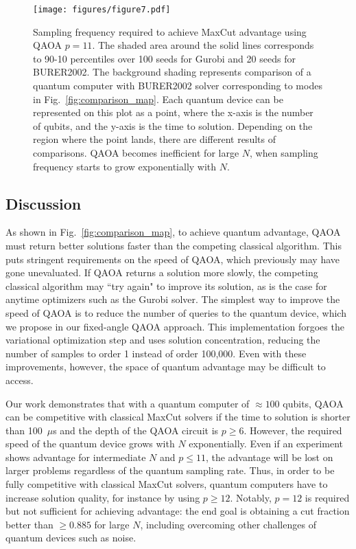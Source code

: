 \begin{figure}
    \centering
    \texttt{[image: figures/figure7.pdf]}
    \caption{
    Sampling frequency required to achieve MaxCut advantage using QAOA $p=11$.
    The shaded area around the solid lines corresponds to 90-10 percentiles over 100 seeds for Gurobi and 20 seeds for BURER2002.
    The background shading represents comparison of a quantum computer with BURER2002 solver corresponding to modes in Fig.~\ref{fig:comparison_map}.
    Each quantum device can be represented on this plot as a point, where the x-axis is the number of qubits, and the y-axis is the time to solution. 
    Depending on the region where the point lands, there are different results of comparisons.
    QAOA becomes inefficient for large $N$, when sampling frequency starts to grow exponentially with $N$.
    }
    \label{fig:adv_rate}
\end{figure}





\subsection{Discussion}

As shown in Fig.~\ref{fig:comparison_map}, to achieve quantum advantage, QAOA must return better solutions faster than the competing classical algorithm. This puts stringent requirements on the speed of QAOA, which previously may have gone unevaluated. If QAOA returns a solution more slowly, the competing classical algorithm may ``try again" to improve its solution, as is the case for anytime optimizers such as the Gurobi solver. The simplest way to improve the speed of QAOA is to reduce the number of queries to the quantum device, which we propose in our fixed-angle QAOA approach. This implementation forgoes the variational optimization step and uses solution concentration, reducing the number of samples to order 1 instead of order 100,000. Even with these improvements, however, the space of quantum advantage may be difficult to access.

Our work demonstrates that with a quantum computer of $\approx 100$ qubits, QAOA can be competitive with classical MaxCut solvers if the time to solution is shorter than 100~$\mu$s and the depth of the QAOA circuit is $p\geq6$.
However, the required speed of the quantum device grows with $N$ exponentially. Even if an experiment shows advantage for intermediate $N$ and $p\leq11$, the advantage will be lost on larger problems regardless of the quantum sampling rate. 
Thus, in  order  to be fully competitive with classical MaxCut solvers, quantum computers have to increase solution quality, for instance by using $p\geq12$.
Notably, $p=12$ is required but not sufficient for achieving advantage: the end goal is obtaining a cut fraction better than $\geq 0.885$ for large $N$, including overcoming other challenges of quantum devices such as noise.

